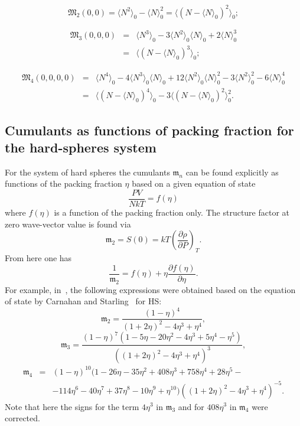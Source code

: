 \begin{equation}
	\mathfrak{M}_2(0,0) = \langle N^2 \rangle_0 - \langle N \rangle_0^2 = \langle (N - \langle N \rangle_0)^2 \rangle_0;
\end{equation}

\begin{eqnarray}
	\mathfrak{M}_3(0,0,0) &=& \langle N^3 \rangle_0 - 3 \langle N^2 \rangle_0 \langle N \rangle_0 +2\langle N \rangle_0^3
	\nonumber\\
	&=& \langle (N - \langle N \rangle_0)^3 \rangle_0;
\end{eqnarray}

\begin{eqnarray}
	\mathfrak{M}_4(0,0,0,0) &=& \langle N^4 \rangle_0 
	- 4\langle N^3 \rangle_0\langle N \rangle_0 
	+ 12\langle N^2 \rangle_0\langle N \rangle_0^2 
	- 3\langle N^2 \rangle_0^2 
	- 6\langle N \rangle_0^4
	\nonumber\\
	&=& \langle (N - \langle N \rangle_0)^4 \rangle_0 - 3 \langle (N - \langle N \rangle_0)^2 \rangle_0^2.
\end{eqnarray}

\subsection{Cumulants as functions of packing fraction for the hard-spheres system}
For the system of hard spheres the cumulants $\mathfrak{m}_n$ can be found explicitly as functions of the packing fraction $\eta$ based on a given equation of state
\begin{equation}
	\frac{PV}{NkT} = f(\eta)
\end{equation}
where $f(\eta)$ is a function of the packing fraction only. The structure factor at zero wave-vector value is found via
\begin{equation}
	\mathfrak{m}_2 = S(0) = kT\left(\frac{\partial \rho}{\partial P}\right)_T.
\end{equation}
From here one has
\begin{equation}
	\frac{1}{\mathfrak{m}_2} = f(\eta) + \eta \frac{\partial f(\eta)}{\partial \eta}.
\end{equation}
For example, in~\cite{Idzik1987En}, the following expressions were obtained based on the equation of state by Carnahan and Starling~\cite{CarnahanStarling1969} for HS:
\begin{equation}
	\mathfrak{m}_2 = \frac{(1-\eta)^4}{(1+2\eta)^2 - 4\eta^3 + \eta^4},
\end{equation}
\begin{equation}
	\mathfrak{m}_3 = \frac{(1-\eta)^7(1 - 5\eta - 20\eta^2 - 4\eta^3 + 5\eta^4 - \eta^5)}{((1+2\eta)^2 - 4\eta^3 + \eta^4)^3},
\end{equation}
\begin{eqnarray}
	\mathfrak{m}_4 &=& (1-\eta)^{10}(1 - 26 \eta - 35\eta^2 + 408\eta^3 + 758\eta^4 + 28\eta^5 -
	\nonumber\\
	&&-114\eta^6 - 40\eta^7 + 37\eta^8 - 10\eta^9 + \eta^{10}) ((1+2\eta)^2 - 4\eta^3 + \eta^4)^{-5}.
\end{eqnarray}
Note that here the signs for the term $4\eta^3$ in $\mathfrak{m}_3$ and for $408\eta^3$ in $\mathfrak{m}_4$ were corrected.
